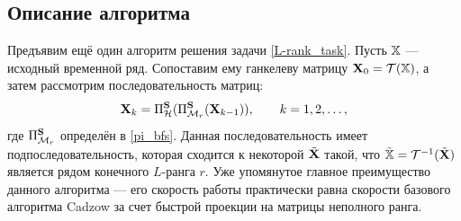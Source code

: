 \documentclass[12pt,a4paper,fleqn,leqno]{article}
\begin{document}
\subsection{Описание алгоритма}
Предъявим ещё один алгоритм решения задачи \eqref{L-rank_task}. Пусть $\mathbb{X}$ --- исходный временной ряд. Сопоставим ему ганкелеву матрицу $\mathbf{X}_0 = \mathcal{T}(\mathbb{X})$, а затем рассмотрим последовательность матриц:
\begin{equation*}
\mathbf{X}_k = \Pi_{\mathcal{H}}^{\mathbf{S}} (\Pi_{\mathcal{M}_r}^{\mathbf{S}} (\mathbf{X}_{k-1})), \qquad k = 1, 2, \ldots,
\end{equation*}
где $\Pi_{\mathcal{M}_r}^{\mathbf{S}}$ определён в \eqref{pi_bfs}.
Данная последовательность имеет подпоследовательность, которая сходится к некоторой $\tilde{\mathbf{X}}$ такой, что $\tilde{\mathbb{X}} = \mathcal{T}^{-1}(\tilde{\mathbf{X}})$ является рядом конечного $L$-ранга $r$. Уже упомянутое главное преимущество данного алгоритма --- его скорость работы практически равна скорости базового алгоритма Cadzow за счет быстрой проекции на матрицы неполного ранга.
\end{document}
